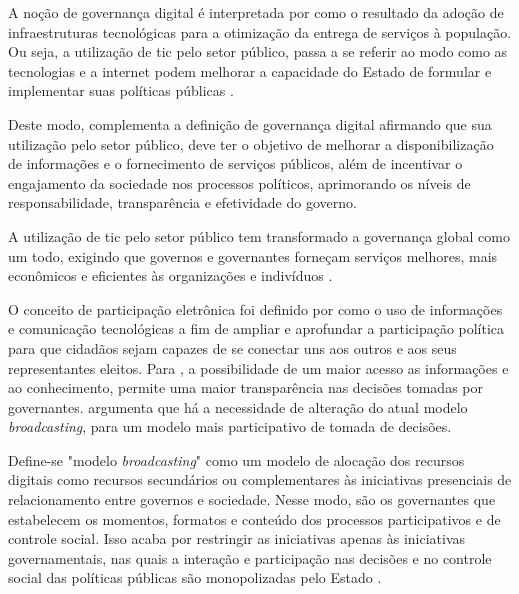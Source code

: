 \par
A noção de governança digital é interpretada por  como o resultado da adoção de infraestruturas tecnológicas 
para a otimização da entrega de serviços à população. Ou seja, a utilização de \acrshort{tic} pelo setor público, passa a se referir ao modo como as tecnologias e a
internet podem melhorar a capacidade do Estado de formular e implementar suas políticas públicas \cite{parra2017governancca}.

\par
Deste modo,  complementa a definição de governança digital afirmando que sua utilização pelo setor público,
deve ter o objetivo de melhorar a disponibilização de informações e o fornecimento de serviços públicos, além de incentivar o engajamento
da sociedade nos processos políticos, aprimorando os níveis de responsabilidade, transparência e efetividade do governo.

\par
A utilização de \acrshort{tic} pelo setor público tem transformado a governança global como um todo, exigindo que governos e governantes forneçam
serviços melhores, mais econômicos e eficientes às organizações e indivíduos \cite{afdb2014uneca}. 

\vspace{0.3CM}

\par
O conceito de participação eletrônica foi definido por  como o uso de informações e comunicação tecnológicas a fim de ampliar e aprofundar
a participação política para que cidadãos sejam capazes de se conectar uns aos outros e aos seus representantes eleitos.
Para , a possibilidade de um maior acesso as informações e ao conhecimento, permite uma maior transparência nas decisões tomadas por governantes.
 argumenta que há a necessidade de alteração do atual modelo
\textit{broadcasting}, para um modelo mais participativo de tomada de decisões.

\par
Define-se "modelo \textit{broadcasting}" como um modelo de alocação dos recursos digitais como recursos secundários ou complementares às iniciativas presenciais
de relacionamento entre governos e sociedade. Nesse modo, são os governantes que estabelecem os momentos, formatos e conteúdo dos processos participativos e de controle social.
Isso acaba por restringir as iniciativas apenas às iniciativas governamentais, nas quais a interação e participação nas decisões e no controle social das políticas públicas 
são monopolizadas pelo Estado \cite{parra2017governancca}.

